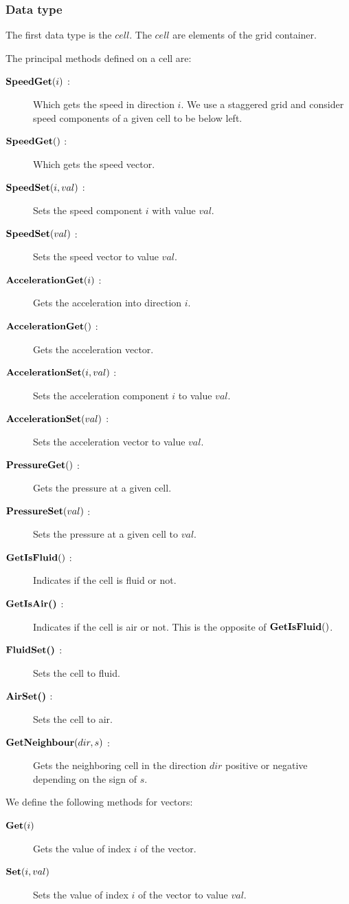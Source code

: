 \subsubsection{Data type}

The first data type is the $cell$. The $cell$ are elements of the grid container.

The principal methods defined on a cell are:
\begin{description}
 \item[$\mathop{\textbf{SpeedGet}}(i)$ :] Which gets the speed in direction $i$. We use a staggered grid and consider speed components of a given cell
 to be below left.
  \item[$\mathop{\textbf{SpeedGet}}()$ :] Which gets the speed vector.
 \item[$\mathop{\textbf{SpeedSet}}(i,val)$ :] Sets the speed component $i$ with value $val$.
 \item[$\mathop{\textbf{SpeedSet}}(val)$ :] Sets the speed vector to value $val$.
 \item[$\mathop{\textbf{AccelerationGet}}(i)$ :]  Gets the acceleration into direction $i$.
 \item[$\mathop{\textbf{AccelerationGet}}()$ :]  Gets the acceleration vector.
 \item[$\mathop{\textbf{AccelerationSet}}(i,val)$ :] Sets the acceleration component $i$ to value $val$.
 \item[$\mathop{\textbf{AccelerationSet}}(val)$ :] Sets the acceleration vector to value $val$.
 \item[$\mathop{\textbf{PressureGet}}()$ :] Gets the pressure at a given cell.
 \item[$\mathop{\textbf{PressureSet}}(val)$ :] Sets the pressure at a given cell to $val$.
 \item[$\mathop{\textbf{GetIsFluid}}()$ :] Indicates if the cell is fluid or not.
 \item[$\mathop{\textbf{GetIsAir()}}$ :] Indicates if the cell is air or not. This is the opposite of $\mathop{\textbf{GetIsFluid}}()$.
 \item[$\mathop{\textbf{FluidSet()}}$ :] Sets the cell to fluid.
 \item[$\mathop{\textbf{AirSet()}}$ :] Sets the cell to air.
 \item[$\mathop{\textbf{GetNeighbour}}(dir,s)$ :] Gets the neighboring cell in the direction $dir$ positive or negative depending on the sign of $s$.
\end{description}

We define the following methods for vectors:
\begin{description}
 \item[$\mathop{\textbf{Get}}(i)$] Gets the value of index $i$ of the vector.
  \item[$\mathop{\textbf{Set}}(i,val)$] Sets the value of index $i$ of the vector to value $val$.
\end{description}

